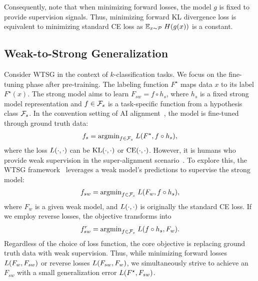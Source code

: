 Consequently, note that when minimizing forward losses, the model $g$ is fixed to provide supervision signals. Thus, minimizing forward KL divergence loss is equivalent to minimizing standard CE loss as $\mathbb{E}_{x \sim \mathcal{P}} \; H(g(x))$ is a constant.





\subsection{Weak-to-Strong Generalization}


Consider WTSG in the context of $k$-classification tasks. We focus on the fine-tuning phase after pre-training.
The labeling function $F^\star$ maps data $x$ to its label $F^\star(x)$.
The strong model aims to learn $F_{sw} = f \circ h_s$, where $h_s$ is a fixed strong model representation and $f \in \mathcal{F}_{s}$ is a task-specific function from a hypothesis class $\mathcal{F}_{s}$.
In the convention setting of AI alignment~\citep{ouyang2022training}, the model is fine-tuned through ground truth data:
\begin{align}
    \label{eqn:alignment-population-minimizer}
    f_{s} = \text{argmin}_{f \in \mathcal{F}_{s}}\; L(F^\star, f \circ h_s),
\end{align}
where the loss $L(\cdot, \cdot)$ can be $\mathrm{KL}(\cdot, \cdot)$ or $\mathrm{CE}(\cdot, \cdot)$.
However, 
it is humans who provide weak supervision in the super-alignment scenario~\citep{openai_superalignment}. 
To explore this, the WTSG framework~\citep{burns2023weak} leverages a weak model’s predictions to supervise the strong model:
\begin{align}
    \label{eqn:fsw-population-minimizer}
    f_{sw} = \text{argmin}_{f \in \mathcal{F}_{s}}\; L(F_w, f \circ h_s),
\end{align}
where $F_w$ is a given weak model, and $L(\cdot, \cdot)$ is originally the standard CE loss.
If we employ reverse losses, the objective transforms into
\begin{align}
    f_{sw}^{r} = \text{argmin}_{f \in \mathcal{F}_{s}}\; L(f \circ h_s, F_w).
\end{align}
Regardless of the choice of loss function, the core objective is replacing ground truth data with weak supervision.
Thus, while minimizing forward losses $L(F_w, F_{sw})$ or reverse losses $L(F_{sw}, F_w)$, we simultaneously strive to achieve an $F_{sw}$ with a small generalization error $L(F^\star, F_{sw})$.





